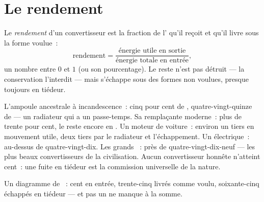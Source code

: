 \section{Le rendement}

\begin{definition}[Rendement]\label{def:g9:energy-conversions:efficiency}
Le \emph{rendement} d'un convertisseur est la
fraction de l' qu'il reçoit et qu'il livre sous la forme
voulue~:
\[
\text{rendement} =
\frac{\text{énergie utile en sortie}}{\text{énergie totale en entrée}},
\]
un nombre entre $0$ et $1$ (ou son pourcentage). Le reste n'est pas
détruit --- la conservation l'interdit --- mais s'échappe sous des
formes non voulues, presque toujours en tiédeur.
\end{definition}

\begin{example}\label{ex:g9:energy-conversions:reportcards}
L'ampoule ancestrale à incandescence~: cinq pour cent de ,
quatre-vingt-quinze de  --- un radiateur qui a un passe-temps.
Sa remplaçante moderne~: plus de trente pour cent, le reste encore en
. Un moteur de voiture~: environ un tiers en mouvement utile,
deux tiers par le radiateur et l'échappement. Un  électrique~:
au-dessus de quatre-vingt-dix. Les grands ~: près de
quatre-vingt-dix-neuf --- les plus beaux convertisseurs de la
civilisation. Aucun convertisseur honnête n'atteint cent~: une
fuite en tiédeur est la commission universelle de la nature.
\end{example}

\begin{omfigure}

{\small Un diagramme de ~: cent  en entrée,
trente-cinq livrés comme voulu, soixante-cinq échappés en tiédeur ---
et pas un  ne manque à la somme.}
\end{omfigure}


